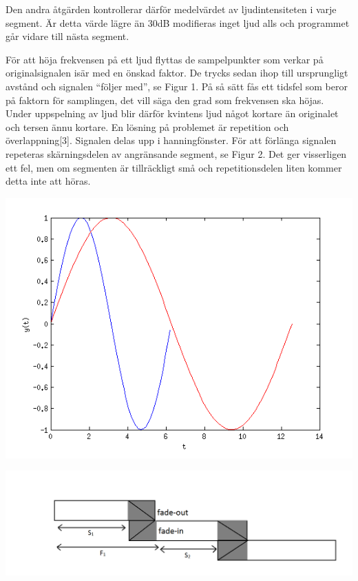\documentclass[12pt,a4paper]{article}
\newenvironment{Figure}
  {\par\medskip\noindent\minipage{\linewidth}}
  {\endminipage\par\medskip}
\begin{document}
Den andra åtgärden kontrollerar därför medelvärdet av ljudintensiteten i varje segment. Är detta värde lägre än 30dB modifieras inget ljud alls och programmet går vidare till nästa segment.

För att höja frekvensen på ett ljud flyttas de sampelpunkter som verkar på originalsignalen isär med en önskad faktor. De trycks sedan ihop till ursprungligt avstånd och signalen “följer med”, se Figur 1. På så sätt fås ett tidsfel som beror på faktorn för samplingen, det vill säga den grad som frekvensen ska höjas. Under uppspelning av ljud blir därför kvintens ljud något kortare än originalet och tersen ännu kortare. En lösning på problemet är repetition och överlappning[3]. Signalen delas upp i hanningfönster. För att förlänga signalen repeteras skärningsdelen av angränsande segment, se Figur 2. Det ger visserligen ett fel, men om segmenten är tillräckligt små och repetitionsdelen liten kommer detta inte att höras.

\begin{Figure}
  \centering
    \includegraphics[width=0.7\linewidth]{./images/resample.png}
\end{Figure}

\begin{Figure}
  \centering
    \includegraphics[width=0.7\linewidth]{./images/overlap.png}
\end{Figure}
\end{document}
